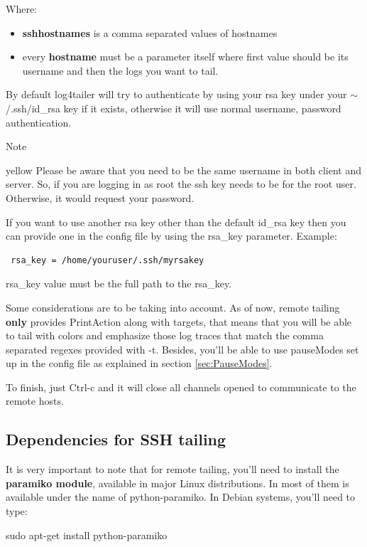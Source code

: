 \noindent
Where:
\begin{itemize}
\item \textbf{sshhostnames} is a comma separated values of hostnames
\item every \textbf{hostname} must be a parameter itself where first 
value should be its username and then the logs you want to tail.
\end{itemize}

By default log4tailer will try to authenticate by using your rsa key under your
$\sim$/.ssh/id\_rsa key if it exists, otherwise it will use normal username, password
authentication. 

\begin {bclogo}[logo =\bcinfo, barre = none,noborder = true]{Note}
\begin {gbar}{yellow}
Please be aware that you need to be the same username
in both client and server. So, if you are logging in as root the ssh key needs
to be for the root user. Otherwise, it would request your password.
\end{gbar}
\end{bclogo}
If you want to use another rsa key other than the default
id\_rsa key then you can provide one in the config file by using the rsa\_key
parameter. Example:

\begin{config}
\begin{verbatim}
 rsa_key = /home/youruser/.ssh/myrsakey
\end{verbatim} 
\end{config}

\noindent
rsa\_key value must be the full path to the rsa\_key.

Some considerations are to be taking into account. As of now, remote tailing
\textbf{only} provides PrintAction along with targets, that means that you will
be able to tail with colors and emphasize those log traces that match the comma
separated regexes provided with -t. Besides, you'll be able to use pauseModes
set up in the config file as explained in section \ref{sec:PauseModes}.

To finish, just Ctrl-c and it will close all channels opened to communicate to
the remote hosts. 

\subsection{Dependencies for SSH tailing}
It is very important to note that for remote tailing, you'll need to install
the \textbf{paramiko module}, available in major Linux distributions. In most
of them is available under the name of python-paramiko. In Debian systems,
you'll need to type:
\begin{cmd}
 sudo apt-get install python-paramiko
\end{cmd}

